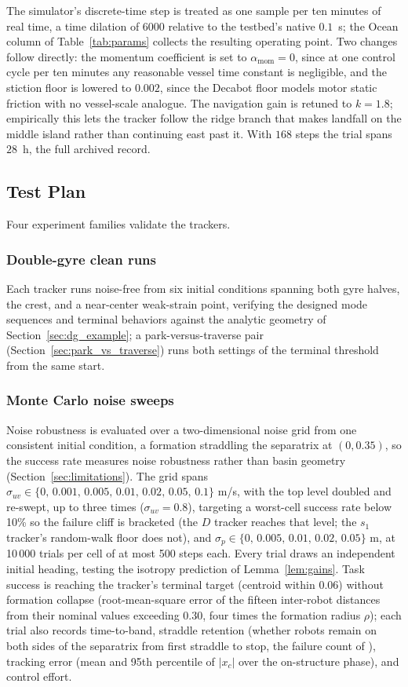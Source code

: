 \documentclass[lettersize,journal]{IEEEtran}
\begin{document}
The simulator's discrete-time step is treated as one sample per ten
minutes of real time, a time dilation of 6000 relative to the testbed's
native $0.1$~s; the Ocean column of Table~\ref{tab:params} collects
the resulting operating point. Two changes follow directly: the
momentum coefficient is set to $\alpha_{\text{mom}} = 0$, since at one
control cycle per ten minutes any reasonable vessel time constant is
negligible, and the stiction floor is lowered to $0.002$, since the
Decabot floor models motor static friction with no vessel-scale
analogue. The navigation gain is retuned to $k = 1.8$; empirically this
lets the tracker follow the ridge branch that makes landfall on the
middle island rather than continuing east past it. With $168$ steps the
trial spans $28$~h, the full archived record.

\subsection{Test Plan}
\label{sec:test_plan}

Four experiment families validate the trackers.

\subsubsection{Double-gyre clean runs}
Each tracker runs noise-free from six initial conditions spanning both
gyre halves, the crest, and a near-center weak-strain point, verifying
the designed mode sequences and terminal behaviors against the analytic
geometry of Section~\ref{sec:dg_example}; a park-versus-traverse pair
(Section~\ref{sec:park_vs_traverse}) runs both settings of the terminal
threshold from the same start.

\subsubsection{Monte Carlo noise sweeps}
Noise robustness is evaluated over a two-dimensional noise grid from
one consistent initial condition, a formation straddling the separatrix
at $(0, 0.35)$, so the success rate measures noise robustness rather
than basin geometry (Section~\ref{sec:limitations}). The grid spans $\sigma_{uv} \in \{0,\,
0.001,\, 0.005,\, 0.01,\, 0.02,\, 0.05,\, 0.1\}$ m/s, with the top
level doubled and re-swept, up to three times ($\sigma_{uv} = 0.8$),
targeting a worst-cell success rate below 10\% so the failure cliff is
bracketed (the $D$ tracker reaches that level; the $s_1$ tracker's
random-walk floor does not), and $\sigma_p \in
\{0,\, 0.005,\, 0.01,\, 0.02,\, 0.05\}$ m, at 10\,000 trials per cell of
at most 500 steps each. Every trial draws an independent initial
heading, testing the isotropy prediction of Lemma~\ref{lem:gains}.
Task success is reaching the tracker's terminal target (centroid
within 0.06) without formation collapse (root-mean-square error of the
fifteen inter-robot distances from their nominal values exceeding
0.30, four times the formation radius $\rho$); each trial also
records time-to-band, straddle retention (whether robots remain on
both sides of the separatrix from first straddle to stop, the failure
count of \cite{9}), tracking error (mean and 95th percentile of
$|x_c|$ over the on-structure phase), and control effort.
\end{document}
